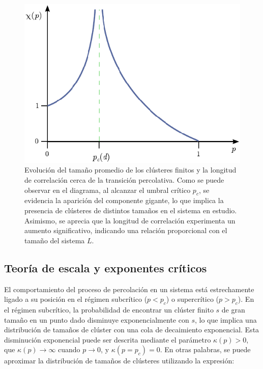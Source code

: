 \begin{figure}[h!]
	\centering\includegraphics[width=\imsize]{promedio.png}
	\caption[Evolución del tamaño promedio de los clústeres finitos y la longitud de correlación cerca de la transición percolativa.]{ Evolución del tamaño promedio de los clústeres finitos y la longitud de correlación cerca de la transición percolativa. Como se puede observar en el diagrama, al alcanzar el umbral crítico $p_c$, se evidencia la aparición del componente gigante, lo que implica la presencia de clústeres de distintos tamaños en el sistema en estudio. Asimismo, se aprecia que la longitud de correlación experimenta un aumento significativo, indicando una relación proporcional con el tamaño del sistema $L$.}\label{fig:promedio}
\end{figure}


\subsection{Teoría de escala y exponentes críticos}



El comportamiento del proceso de percolación en un sistema está estrechamente ligado a su posición en el régimen subcrítico ($p < p_c$) o supercrítico ($p > p_c$). En el régimen subcrítico, la probabilidad de encontrar un clúster finito $s$ de gran tamaño en un punto dado disminuye exponencialmente con $s$, lo que implica una distribución de tamaños de clúster con una cola de decaimiento exponencial. Esta disminución exponencial puede ser descrita mediante el parámetro $\kappa(p) > 0$, que $\kappa(p) \to\infty$ cuando $p\to0$, y $\kappa(p = p_c ) = 0$. En otras palabras, se puede aproximar la distribución de tamaños de clústeres utilizando la expresión:

